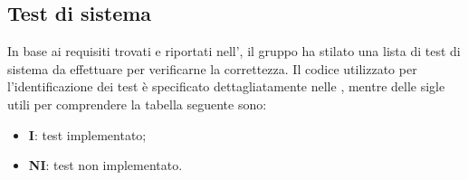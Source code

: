 \subsection{Test di sistema}
In base ai requisiti trovati e riportati nell'\AdRv{}, il gruppo ha stilato una lista di test di sistema da effettuare per verificarne la correttezza.
Il codice utilizzato per l'identificazione dei test è specificato dettagliatamente nelle , mentre delle sigle utili per comprendere la tabella seguente sono:
\begin{itemize}
	\item \textbf{I}: test implementato;
	\item \textbf{NI}: test non implementato.
\end{itemize} 

\newpage
\renewcommand{\arraystretch}{1.5}
\renewcommand\extrarowheight{1.5pt}
